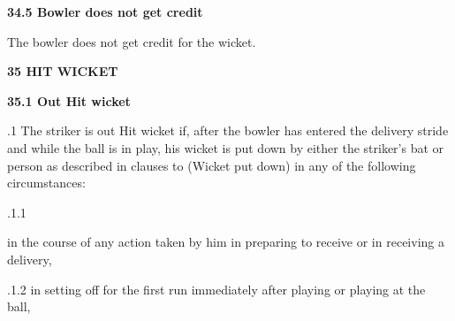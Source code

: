\documentclass[12pt]{article}
\begin{document}
\vspace{\baselineskip}
{\fontsize{11pt}{13.2pt}\selectfont \textbf{34.5 \tabto{0.47in} Bowler does not get credit}\par}\par


\vspace{\baselineskip}
{\fontsize{9pt}{10.8pt}\selectfont The bowler does not get credit for the wicket.\par}\par


\vspace{\baselineskip}
{\fontsize{16pt}{19.2pt}\selectfont \textbf{35 HIT WICKET}\par}\par


\vspace{\baselineskip}
{\fontsize{11pt}{13.2pt}\selectfont \textbf{35.1 \tabto{0.47in} Out Hit wicket}\par}\par


\vspace{\baselineskip}
\begin{adjustwidth}{0.5in}{0.01in}
{\fontsize{9pt}{10.8pt}.1 \tabto{0.49in} The striker is out Hit wicket if, after the bowler has entered the delivery stride and while the ball is in play, his wicket is put down by either the striker’s bat or person as described in clauses to (Wicket put down) in any of the following circumstances:\par}\par

\end{adjustwidth}


\vspace{\baselineskip}
\begin{adjustwidth}{0.49in}{0.0in}
{\fontsize{9pt}{10.8pt}.1.1 \tabto{1.17in} {\fontsize{8pt}{9.6pt}\selectfont in the course of any action taken by him in preparing to receive or in receiving a delivery,\par}\par}\par

\end{adjustwidth}


\vspace{\baselineskip}
\begin{adjustwidth}{0.49in}{0.0in}
{\fontsize{9pt}{10.8pt}.1.2 \tabto{1.17in} in setting off for the first run immediately after playing or playing at the ball,\par}\par

\end{adjustwidth}
\end{document}
